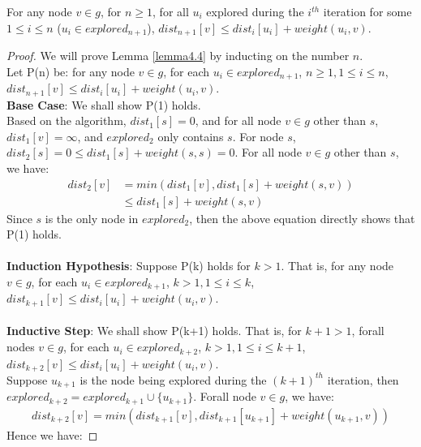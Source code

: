 \begin{sublemma}\label{lemma4.4}
For any node $v \in g$, for $n \geq 1$, for all $u_i$ explored during the $i^{th}$ iteration for some $1 \leq i \leq n$ ($u_i \in explored_{n+1}$), $dist_{n+1}[v] \leq dist_i[u_i] + weight(u_i, v)$. 
\end{sublemma}
\begin{proof}
We will prove Lemma \ref{lemma4.4} by inducting on the number $n$. 
\\
Let P(n) be: for any node $v \in g$, for each $u_i \in explored_{n+1}$, $n \geq 1, 1 \leq i \leq n$, $dist_{n+1}[v] \leq dist_i[u_i] + weight(u_i, v)$. 
\\
\textbf{Base Case}: We shall show P(1) holds. 
\\
Based on the algorithm, $dist_1[s] = 0$, and for all node $v \in g$ other than $s$, $dist_1[v] = \infty$, and $explored_2$ only contains $s$. For node $s$, $dist_2[s] = 0 \leq dist_1[s] + weight(s, s) = 0$. For all node $v \in g$ other than $s$, we have: 
\begin{align*}
      dist_2[v] &= min(dist_1[v], dist_1[s] + weight(s, v)) \\
                &\leq dist_1[s] + weight(s, v)
\end{align*}
Since $s$ is the only node in $explored_2$, then the above equation directly shows that P(1) holds. 
\\\\
\textbf{Induction Hypothesis}: Suppose P(k) holds for $k > 1$. That is, for any node $v \in g$, for each $u_i \in explored_{k+1}$, $k > 1, 1 \leq i \leq k$, $dist_{k+1}[v] \leq dist_i[u_i] + weight(u_i, v)$. 
\\\\
\textbf{Inductive Step}: We shall show P(k+1) holds. That is,  for $k+1 > 1$, forall nodes $v \in g$,  for each $u_i \in explored_{k+2}$, $k > 1, 1 \leq i \leq k+1$, $dist_{k+2}[v] \leq dist_i[u_i] + weight(u_i, v)$. 
\\
Suppose $u_{k+1}$ is the node being explored during the $(k+1)^{th}$ iteration, then $explored_{k+2} = explored_{k+1} \cup \{u_{k+1}\}$. Forall node $v \in g$, we have: 
\begin{align*}
  dist_{k+2}[v] = min(dist_{k+1}[v], dist_{k+1}[u_{k+1}] + weight(u_{k+1}, v))
\end{align*}
Hence we have: 

\end{proof}
